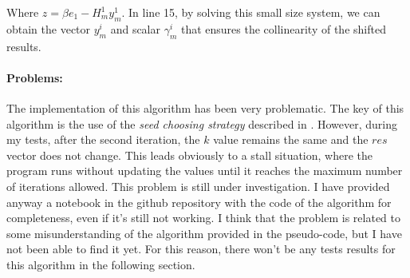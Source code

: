 \noindent Where $z = \beta e_1 - H_m^1 y_m^1$. In line 15, by solving this small size system, we can obtain the vector $y_m^i$ and scalar $\gamma_m^i$ that ensures the collinearity of the shifted results.

\paragraph{Problems:} The implementation of this algorithm has been very problematic. The key of this algorithm is the use of the \emph{seed choosing strategy} described in \cite{SHEN2022126799}. However, during my tests, after the second iteration, the $k$ value remains the same and the $res$ vector does not change. This leads obviously to a stall situation, where the program runs without updating the values until it reaches the maximum number of iterations allowed. This problem is still under investigation. I have provided anyway a notebook in the github repository with the code of the algorithm for completeness, even if it's still not working. I think that the problem is related to some misunderstanding of the algorithm provided in the pseudo-code, but I have not been able to find it yet. For this reason, there won't be any tests results for this algorithm in the following section.


